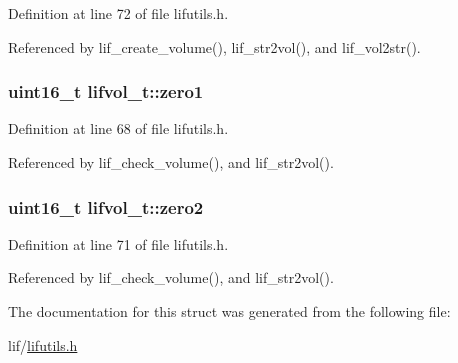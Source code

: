 Definition at line 72 of file lifutils.\+h.



Referenced by lif\+\_\+create\+\_\+volume(), lif\+\_\+str2vol(), and lif\+\_\+vol2str().

\subsubsection[{\texorpdfstring{zero1}{zero1}}]{\setlength{\rightskip}{0pt plus 5cm}uint16\+\_\+t lifvol\+\_\+t\+::zero1}\hypertarget{structlifvol__t_a5e749ae4bff79deaa813966cff04f431}{}\label{structlifvol__t_a5e749ae4bff79deaa813966cff04f431}


Definition at line 68 of file lifutils.\+h.



Referenced by lif\+\_\+check\+\_\+volume(), and lif\+\_\+str2vol().

\subsubsection[{\texorpdfstring{zero2}{zero2}}]{\setlength{\rightskip}{0pt plus 5cm}uint16\+\_\+t lifvol\+\_\+t\+::zero2}\hypertarget{structlifvol__t_ac05fef8e2c908110de7083d7afbfdb37}{}\label{structlifvol__t_ac05fef8e2c908110de7083d7afbfdb37}


Definition at line 71 of file lifutils.\+h.



Referenced by lif\+\_\+check\+\_\+volume(), and lif\+\_\+str2vol().



The documentation for this struct was generated from the following file\+:\begin{DoxyCompactItemize}
\item 
lif/\hyperlink{lifutils_8h}{lifutils.\+h}\end{DoxyCompactItemize}
